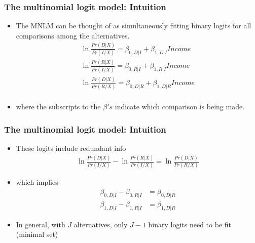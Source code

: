 \documentclass[
  shownotes,
  xcolor={svgnames},
  hyperref={colorlinks,citecolor=DarkBlue,linkcolor=DarkRed,urlcolor=DarkBlue}
  , aspectratio=169]{beamer}
\begin{document}
\begin{frame}[fragile]
\frametitle{The multinomial logit model: Intuition}



\begin{itemize}
 \item The MNLM can be thought of as simultaneously fitting binary logits for all comparisons among the alternatives. 
\medskip
  \begin{align}
  \ln \frac{Pr(D|X)}{Pr(I/X)}=\beta_{0,D|I} +\beta_{1,D|I} Income \\ \nonumber
  \ln \frac{Pr(R|X)}{Pr(I/X)}=\beta_{0,R|I} +\beta_{1,R|I} Income \\ \nonumber
  \ln \frac{Pr(D|X)}{Pr(R/X)}=\beta_{0,D|R} +\beta_{1,D|R} Income \\ \nonumber
  \end{align}

\item where the subscripts to the $\beta's$ indicate which comparison is being made. 



\end{itemize}


\end{frame}
\begin{frame}[fragile]
\frametitle{The multinomial logit model: Intuition}



\begin{itemize}
 \item These logits include redundant info
\medskip
\begin{align}
\ln \frac{Pr(D|X)}{Pr(I/X)}- \ln \frac{Pr(R|X)}{Pr(I/X)}= \ln \frac{Pr(D|X)}{Pr(R/X)}
\end{align}

\medskip
\item which implies
\medskip
 \begin{align}
  \beta_{0,D|I} - \beta_{0,R|I} &=\beta_{0,D|R} \\
  \beta_{1,D|I}-\beta_{1,R|I} &= \beta_{1,D|R} 
\end{align}

\medskip
\item In general, with $J$ alternatives, only $J-1$ binary logits need to be fit (minimal set)

 

\end{itemize}

\end{frame}
\end{document}
